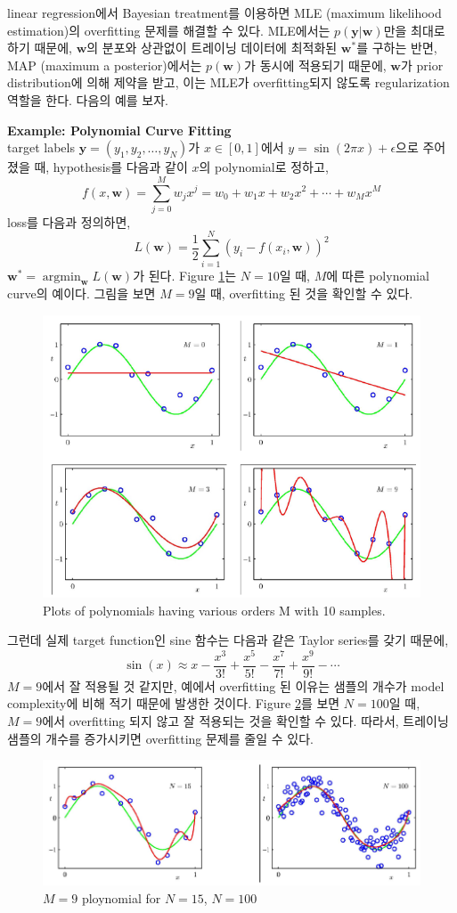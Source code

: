 \documentclass[twoside]{article}
\DeclareMathOperator*{\argmin}{argmin}
\begin{document}
linear regression에서 Bayesian treatment를 이용하면 MLE (maximum likelihood estimation)의 overfitting 문제를 해결할 수 있다. MLE에서는 $p(\mathbf{y}|\mathbf{w})$만을 최대로 하기 때문에, $\mathbf{w}$의 분포와 상관없이 트레이닝 데이터에 최적화된 $\mathbf{w}^*$를 구하는 반면, MAP (maximum a posterior)에서는 $p(\mathbf{w})$가 동시에 적용되기 때문에, $\mathbf{w}$가 prior distribution에 의해 제약을 받고, 이는 MLE가 overfitting되지 않도록 regularization 역할을 한다. 다음의 예를 보자.

\textbf{Example: Polynomial Curve Fitting}\\
target labels $\mathbf{y} = (y_1, y_2, \ldots, y_N)$가 $x \in [0, 1]$에서 $y=\sin(2 \pi x) + \epsilon$으로 주어졌을 때, hypothesis를 다음과 같이 $x$의 polynomial로 정하고,
$$f(x, \mathbf{w}) = \sum_{j=0}^{M} w_j x^j = w_0 + w_1 x + w_2 x^2 + \cdots + w_M x^M$$
loss를 다음과 정의하면,
$$L(\mathbf{w}) = \frac{1}{2} \sum_{i=1}^{N} (y_i - f(x_i, \mathbf{w}))^2$$
$\mathbf{w}^* = \argmin_\mathbf{w} L(\mathbf{w})$가 된다. Figure \ref{fig:13-4}는 $N=10$일 때, $M$에 따른 polynomial curve의 예이다. 그림을 보면 $M=9$일 때, overfitting 된 것을 확인할 수 있다.

\begin{figure}[h]
	\centering
	\includegraphics[width=0.5\linewidth]{13-4}
	\caption{Plots of polynomials having various orders M with 10 samples.}
	\label{fig:13-4}
\end{figure}

그런데 실제 target function인 sine 함수는 다음과 같은 Taylor series를 갖기 때문에,
$$\sin (x) \approx x - \frac{x^3}{3!} + \frac{x^5}{5!} - \frac{x^7}{7!} + \frac{x^9}{9!} - \cdots$$
$M=9$에서 잘 적용될 것 같지만, 예에서 overfitting 된 이유는 샘플의 개수가 model complexity에 비해 적기 때문에 발생한 것이다. Figure \ref{fig:13-5}를 보면 $N=100$일 때, $M=9$에서 overfitting 되지 않고 잘 적용되는 것을 확인할 수 있다. 따라서, 트레이닝 샘플의 개수를 증가시키면 overfitting 문제를 줄일 수 있다.

\begin{figure}[h]
	\centering
	\includegraphics[width=0.7\linewidth]{13-5}
	\caption{$M=9$ ploynomial for $N=15$, $N=100$}
	\label{fig:13-5}
\end{figure}
\end{document}
